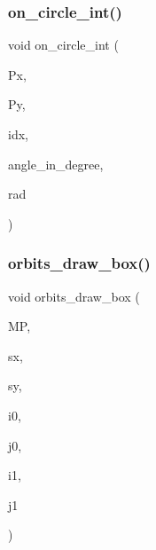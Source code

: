 \subsubsection{\texorpdfstring{on\+\_\+circle\+\_\+int()}{on\_circle\_int()}}
{\footnotesize\ttfamily void on\+\_\+circle\+\_\+int (\begin{DoxyParamCaption}\item[{\mbox{\hyperlink{galois_8h_a09fddde158a3a20bd2dcadb609de11dc}{I\+NT}} $\ast$}]{Px,  }\item[{\mbox{\hyperlink{galois_8h_a09fddde158a3a20bd2dcadb609de11dc}{I\+NT}} $\ast$}]{Py,  }\item[{\mbox{\hyperlink{galois_8h_a09fddde158a3a20bd2dcadb609de11dc}{I\+NT}}}]{idx,  }\item[{\mbox{\hyperlink{galois_8h_a09fddde158a3a20bd2dcadb609de11dc}{I\+NT}}}]{angle\+\_\+in\+\_\+degree,  }\item[{\mbox{\hyperlink{galois_8h_a09fddde158a3a20bd2dcadb609de11dc}{I\+NT}}}]{rad }\end{DoxyParamCaption})}

\mbox{\label{draw_8_c_aeec0f332c0b0bc38273c1daac1cb85db}} 
\subsubsection{\texorpdfstring{orbits\+\_\+draw\+\_\+box()}{orbits\_draw\_box()}}
{\footnotesize\ttfamily void orbits\+\_\+draw\+\_\+box (\begin{DoxyParamCaption}\item[{\mbox{\hyperlink{classmp__graphics}{mp\+\_\+graphics}} \&}]{MP,  }\item[{\mbox{\hyperlink{galois_8h_a09fddde158a3a20bd2dcadb609de11dc}{I\+NT}}}]{sx,  }\item[{\mbox{\hyperlink{galois_8h_a09fddde158a3a20bd2dcadb609de11dc}{I\+NT}}}]{sy,  }\item[{\mbox{\hyperlink{galois_8h_a09fddde158a3a20bd2dcadb609de11dc}{I\+NT}}}]{i0,  }\item[{\mbox{\hyperlink{galois_8h_a09fddde158a3a20bd2dcadb609de11dc}{I\+NT}}}]{j0,  }\item[{\mbox{\hyperlink{galois_8h_a09fddde158a3a20bd2dcadb609de11dc}{I\+NT}}}]{i1,  }\item[{\mbox{\hyperlink{galois_8h_a09fddde158a3a20bd2dcadb609de11dc}{I\+NT}}}]{j1 }\end{DoxyParamCaption})}

